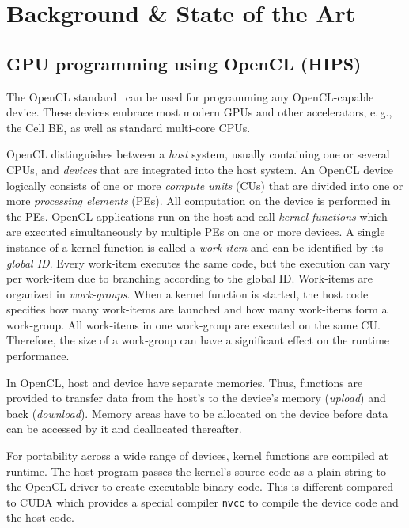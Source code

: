 
\chapter{Background \& State of the Art} %

\label{chapter:background}
\label{chapter:state-of-the-art}

\section{GPU programming using OpenCL (HIPS)}

The OpenCL standard~\cite{OpenCL-10} can be used for programming any OpenCL-capable device.
These devices embrace most modern GPUs and other accelerators, e.\,g., the Cell BE, as well as standard multi-core CPUs.

OpenCL distinguishes between a \emph{host} system, usually containing one or several CPUs, and \emph{devices} that are integrated into the host system.
An OpenCL device logically consists of one or more \emph{compute units} (CUs) that are divided into one or more \emph{processing elements} (PEs).
All computation on the device is performed in the PEs.
OpenCL applications run on the host and call \emph{kernel functions} which are executed simultaneously by multiple PEs on one or more devices.
A single instance of a kernel function is called a \emph{work-item} and can be identified by its \emph{global ID}.
Every work-item executes the same code, but the execution can vary per work-item due to branching according to the global ID.
Work-items are organized in \emph{work-groups}.
When a kernel function is started, the host code specifies how many work-items are launched and how many work-items form a work-group.
All work-items in one work-group are executed on the same CU.
Therefore, the size of a work-group can have a significant effect on the runtime performance.

In OpenCL, host and device have separate memories.
Thus, functions are provided to transfer data from the host's to the device's memory (\emph{upload}) and back (\emph{download}).
Memory areas have to be allocated on the device before data can be accessed by it and deallocated thereafter.

For portability across a wide range of devices, kernel functions are compiled at runtime.
The host program passes the kernel's source code as a plain string to the OpenCL driver to create executable binary code.
This is different compared to CUDA which provides a special compiler \texttt{nvcc} to compile the device code and the host code.

